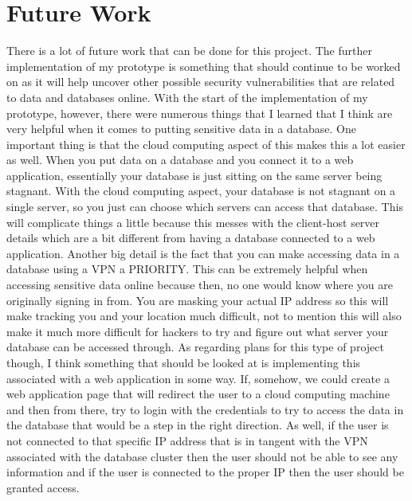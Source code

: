 \section{Future Work}

There is a lot of future work that can be done for this project. The further implementation
of my prototype is something that should continue to be worked on as it will
help uncover other possible security vulnerabilities that are related to data and databases
online. With the start of the implementation of my prototype, however, there were numerous
things that I learned that I think are very helpful when it comes to putting sensitive
data in a database. One important thing is that the cloud computing aspect of this
makes this a lot easier as well. When you put data on a database and you connect it
to a web application, essentially your database is just sitting on the same server
being stagnant. With the cloud computing aspect, your database is not stagnant on a  single server, so you just can choose which servers can access that database. This will complicate things
a little because this messes with the client-host server details which are a bit
different from having a database connected to a web application. Another big detail is
the fact that you can make accessing data in a database using a VPN a PRIORITY. This can be extremely helpful when
accessing sensitive data online because then, no one would know where you are originally
signing in from. You are masking your actual IP address so this will make tracking you
and your location much difficult, not to mention this will also make it much more
difficult for hackers to try and figure out what server your database can be accessed
through. As regarding plans for this type of project though, I think something
that should be looked at is implementing this associated with a web application in
some way. If, somehow, we could create a web application page that will redirect the
user to a cloud computing machine and then from there, try to login with the credentials
to try to access the data in the database that would be a step in the right direction. As well, if the user is not connected to that
specific IP address that is in tangent with the VPN associated with the database cluster
then the user should not be able to see any information and if the user is connected to
the proper IP then the user should be granted access.


